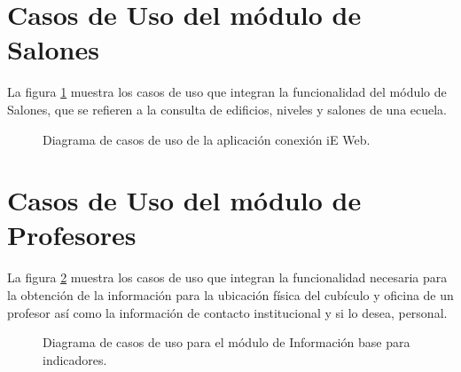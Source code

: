 %
%
%
%
%
%
%


\section{Casos de Uso del módulo de Salones}

    La figura \ref{fig:casosUso:web} muestra los casos de uso que integran la funcionalidad del módulo de Salones, que se refieren a la consulta de edificios, niveles y salones de una ecuela.

    \begin{figure}[h!]
	\begin{center}
	\caption{Diagrama de casos de uso de la aplicación conexión iE Web. \label{fig:casosUso:web}}
	\end{center}
    \end{figure}

\section{Casos de Uso del módulo de Profesores}
La figura \ref{fig:casosUso:movil} muestra los casos de uso que integran la funcionalidad necesaria para la obtención de la información para la ubicación física del cubículo y oficina de un profesor así como la información de contacto institucional y si lo desea, personal.

 \begin{figure}[h!]
     \begin{center}
     \caption{Diagrama de casos de uso para el módulo de Información base para indicadores.}
     \label{fig:casosUso:movil}
     \end{center}
 \end{figure}

